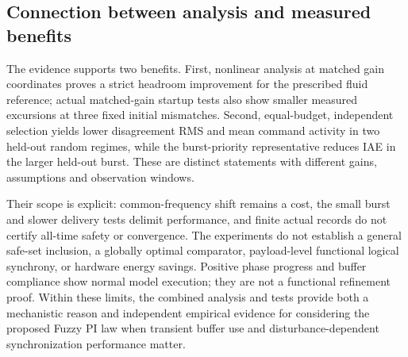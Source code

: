 \subsection{Connection between analysis and measured benefits}
\label{detail:subsec:eval_support}

The evidence supports two benefits. First, nonlinear analysis at
matched gain coordinates proves a strict headroom improvement for the
prescribed fluid reference; actual matched-gain startup tests also show
smaller measured excursions at three fixed initial mismatches. Second,
equal-budget, independent selection yields lower disagreement RMS and
mean command activity in two held-out random regimes, while the
burst-priority representative reduces IAE in the larger held-out burst.
These are distinct statements with different gains, assumptions and
observation windows.

Their scope is explicit: common-frequency shift remains a cost, the
small burst and slower delivery tests delimit performance, and finite
actual records do not certify all-time safety or convergence. The
experiments do not establish a general safe-set inclusion, a globally
optimal comparator, payload-level functional logical synchrony, or
hardware energy savings. Positive phase progress and buffer compliance
show normal model execution; they are not a functional refinement proof.
Within these limits, the combined analysis and tests provide both a
mechanistic reason and independent empirical evidence for considering
the proposed Fuzzy PI law when transient buffer use and
disturbance-dependent synchronization performance matter.


